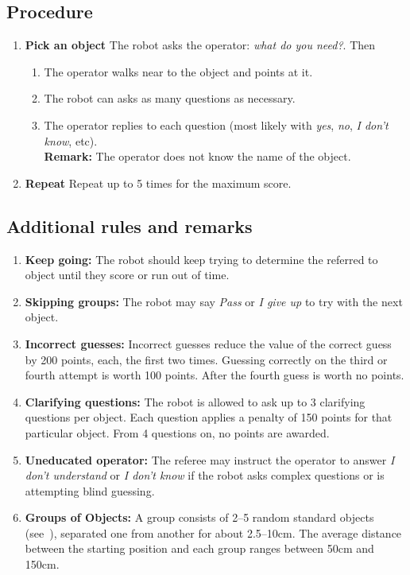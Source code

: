 \subsection*{Procedure}
\begin{enumerate}[nosep]
	\item \textbf{Pick an object} The robot asks the operator: \emph{what do you need?}. %
	Then
	\begin{enumerate}[nosep]
		\item The operator walks near to the object and points at it.
		\item The robot can asks as many questions as necessary.
		\item The operator replies to each question (most likely with \emph{yes}, \emph{no}, \emph{I don't know}, etc).
		\\\textbf{Remark:} The operator does not know the name of the object.
	\end{enumerate}
  \item \textbf{Repeat} Repeat up to 5 times for the maximum score.
\end{enumerate}


%
%
\subsection*{Additional rules and remarks}
\begin{enumerate}[nosep]
	\item \textbf{Keep going:} The robot should keep trying to determine the referred to object until they score or run out of time.

	\item \textbf{Skipping groups:} The robot may say \emph{Pass} or \emph{I give up} to try with the next object.

	\item \textbf{Incorrect guesses:} Incorrect guesses reduce the value of the correct guess by 200 points, each, the first two times. Guessing correctly on the third or fourth attempt is worth 100 points. After the fourth guess is worth no points.

	\item\textbf{Clarifying questions:} The robot is allowed to ask up to 3 clarifying questions per object. Each question applies a penalty of 150 points for that particular object. From 4 questions on, no points are awarded.

	\item\textbf{Uneducated operator:} The referee may instruct the operator to answer \emph{I don't understand} or \emph{I don't know} if the robot asks complex questions or is attempting blind guessing.

	\item \textbf{Groups of Objects:} A group consists of 2--5 random standard objects (see~), separated one from another for about 2.5--10cm.
	The average distance between the starting position and each group ranges between 50cm and 150cm.

\end{enumerate}

